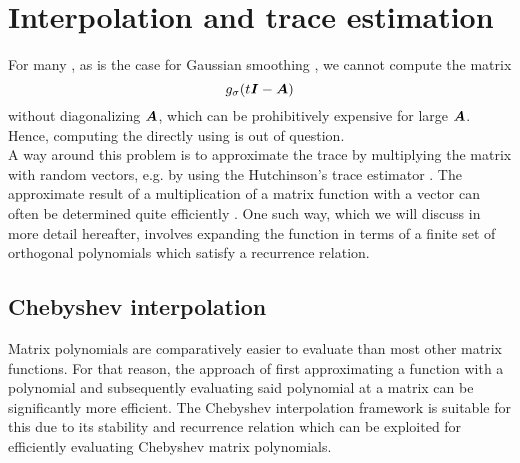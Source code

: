 \chapter{Interpolation and trace estimation}
\label{chp:2-chebyshev}

For many , as is the case for Gaussian smoothing
, we cannot compute the matrix
\begin{equation}
    g_{\sigma}(t\boldsymbol{I} - \boldsymbol{A})
    \label{equ:2-chebyshev-matrix-function}
\end{equation}
without diagonalizing $\boldsymbol{A}$, which can be prohibitively expensive for large
$\boldsymbol{A}$. Hence, computing the  
directly using  is out of
question.\\

A way around this problem is to approximate the trace by multiplying the matrix
with random vectors, e.g. by using the Hutchinson's trace estimator \cite{hutchinson1990trace}.
The approximate result of a multiplication of a matrix function with a vector can
often be determined quite efficiently .
One such way, which we will discuss in more detail hereafter, involves
expanding the function in terms of a finite set of orthogonal polynomials which
satisfy a recurrence relation.



\section{Chebyshev interpolation}
\label{sec:2-chebyshev-interpolation}

Matrix polynomials are comparatively easier to evaluate than most other
matrix functions. For that reason, the approach of first approximating
a function with a polynomial and subsequently evaluating said polynomial at a
matrix can be significantly more efficient.
The Chebyshev interpolation framework is suitable for this due to its stability
and recurrence relation  which can
be exploited for efficiently evaluating Chebyshev matrix polynomials.\\

